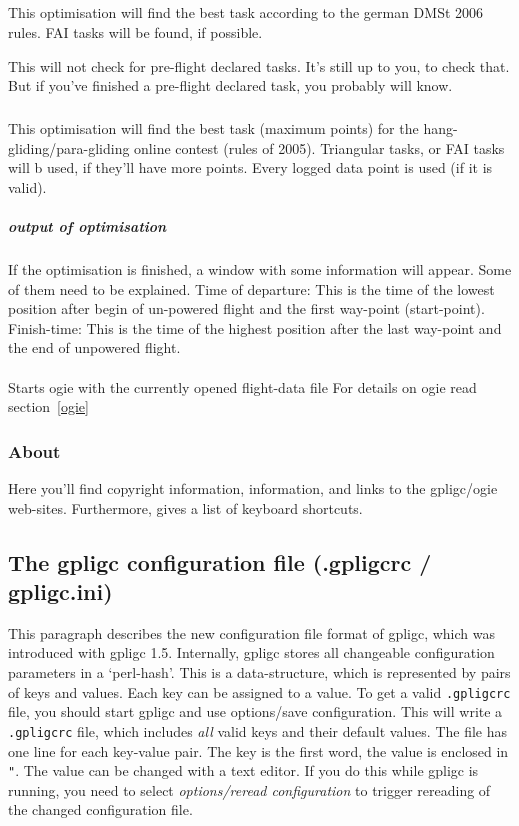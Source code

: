 \subparagraph{
}
This optimisation will find the best task according to the german DMSt 2006 rules. FAI tasks will be found, if possible.

This will not check for pre-flight declared tasks. It's still up to you, to check that. But if you've finished a pre-flight declared task, you probably will know.


\subparagraph{
}
This optimisation will find the best task (maximum points)  for the hang-gliding/para-gliding online contest (rules of 2005). Triangular
tasks, or FAI tasks will b used, if they'll have more points. Every logged data point is used (if it is valid).


\subparagraph{output of optimisation} If the optimisation is finished, a window with some information will appear.
Some of them need to be explained. Time of departure: This is the time of the lowest position after begin of un-powered flight and the first way-point (start-point). Finish-time: This is the time of the highest position after the last way-point and the end of unpowered flight.


\paragraph{
}
Starts ogie with the currently opened flight-data file
For details on ogie read section~\ref{ogie}



\subsubsection{About}
Here you'll find copyright information, information, and links to the gpligc/ogie web-sites.
Furthermore,  gives a list of keyboard shortcuts.


\subsection{The gpligc configuration file (.gpligcrc / gpligc.ini)}
This paragraph describes the new configuration file format of gpligc, which was introduced with gpligc 1.5.
Internally, gpligc stores all changeable configuration parameters in a `perl-hash'.
This is a data-structure, which is represented by pairs of keys and values.
Each key can be assigned to a value.
To get a valid \texttt{.gpligcrc} file, you should start gpligc and use options/save configuration.
This will write a \texttt{.gpligcrc} file, which includes \emph{all} valid keys and their default values.
The file has one line for each key-value pair.
The key is the first word, the value is enclosed in \texttt{"}.
The value can be changed with a text editor.
If you do this while gpligc is running, you need to select \emph{options/reread configuration} to trigger rereading of the changed configuration file.

